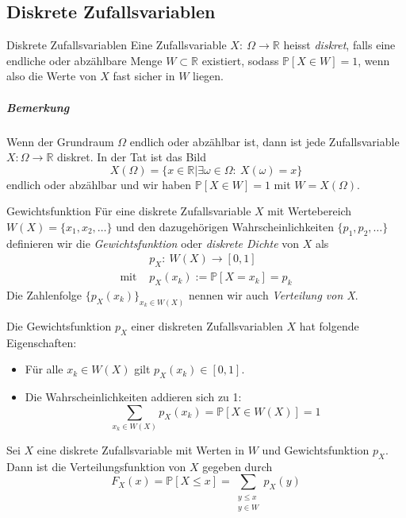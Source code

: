 \documentclass[a4paper,10pt]{article}
\def\R{\mathbb{R}}
\def\P{\mathbb{P}}
\begin{document}
\subsection{Diskrete Zufallsvariablen}

\begin{mainbox}{Diskrete Zufallsvariablen}
    Eine Zufallsvariable \( X: \: \Omega \to \R \) heisst \emph{diskret}, falls eine endliche oder abzählbare Menge \( W \subset \R \) existiert, sodass \( \P[X \in W] = 1 \), wenn also die Werte von \( X \) fast sicher in \( W \) liegen.
\end{mainbox}

\subparagraph{Bemerkung} Wenn der Grundraum \( \Omega \) endlich oder abzählbar ist, dann ist jede Zufallsvariable \( X: \Omega \to \R \) diskret. In der Tat ist das Bild
\[ X(\Omega) = \{x \in \R | \exists \omega \in \Omega: \: X(\omega) = x\} \]
endlich oder abzählbar und wir haben \( \P[X \in W] = 1 \) mit \( W = X(\Omega) \).

\begin{mainbox}{Gewichtsfunktion}
    Für eine diskrete Zufallsvariable \( X \) mit Wertebereich \( W(X) = \{x_1, x_2, \dots \} \) und den dazugehörigen Wahrscheinlichkeiten \( \{p_1, p_2, \dots \} \) definieren wir die \emph{Gewichtsfunktion} oder \emph{diskrete Dichte} von \( X \) als
    \begin{align*}
        &p_X: \: W(X) \to [0, 1] \\
        \text{mit } &p_X(x_k) := \P[X = x_k] = p_k
    \end{align*}
    Die Zahlenfolge \( \{p_X(x_k)\}_{x_k \in W(X)} \) nennen wir auch \emph{Verteilung von X}.
\end{mainbox}

\begin{subbox}{}
    Die Gewichtsfunktion \( p_X \) einer diskreten Zufallsvariablen \( X \) hat folgende Eigenschaften:
    \begin{itemize}
        \item Für alle \( x_k \in W(X) \) gilt \( p_X(x_k) \in [0, 1] \).
        \item Die Wahrscheinlichkeiten addieren sich zu 1:
        \[ \sum_{x_k \in W(X)} p_X(x_k) = \P[X \in W(X)] = 1 \]
    \end{itemize}
\end{subbox}

\begin{subbox}{}
    Sei \( X \) eine diskrete Zufallsvariable mit Werten in \( W \) und Gewichtsfunktion \( p_X \). Dann ist die Verteilungsfunktion von \( X \) gegeben durch
    \[ F_X(x) = \P[X \leq x] = \sum_{\substack{y \leq x \\ y \in W}} p_X(y) \]
\end{subbox}
\end{document}
